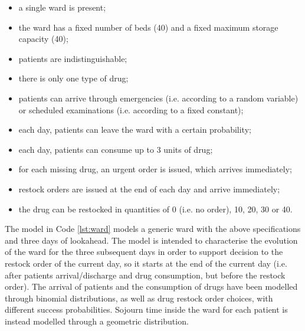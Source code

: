     \begin{itemize}
      \item a single ward is present;
      \item the ward has a fixed number of beds (40) and a fixed maximum storage capacity (40);
      \item patients are indistinguishable;
      \item there is only one type of drug;
      \item patients can arrive through emergencies (i.e. according to a random variable) or scheduled examinations (i.e. according to a fixed constant);
      \item each day, patients can leave the ward with a certain probability;
      \item each day, patients can consume up to 3 units of drug;
      \item for each missing drug, an urgent order is issued, which arrives immediately;
      \item restock orders are issued at the end of each day and arrive immediately;
      \item the drug can be restocked in quantities of 0 (i.e. no order), 10, 20, 30 or 40.
    \end{itemize}
    
    The model in Code \ref{lst:ward} models a generic ward with the above specifications and three days of lookahead. The model is intended to characterise the evolution of the ward for the three subsequent days in order to support decision to the restock order of the current day, so it starts at the end of the current day (i.e. after patients arrival/discharge and drug consumption, but before the restock order). The arrival of patients and the consumption of drugs have been modelled through binomial distributions, as well as drug restock order choices, with different success probabilities. Sojourn time inside the ward for each patient is instead modelled through a geometric distribution.
    
    \begin{center}
      
    \end{center}
    
